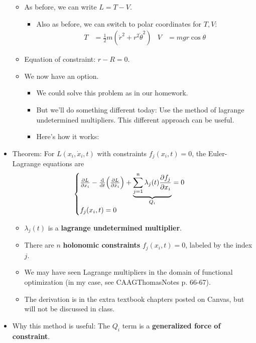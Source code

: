 \documentclass[../notes.tex]{subfiles}
\begin{document}
\begin{itemize}
\begin{itemize}
        \item As before, we can write $L=T-V$.
        \begin{itemize}
            \item Also as before, we can switch to polar coordinates for $T,V$:
            \begin{align*}
                T &= \frac{1}{2}m(\dot{r}^2+r^2\dot{\theta}^2)&
                V &= mgr\cos\theta
            \end{align*}
        \end{itemize}
        \item Equation of constraint: $r-R=0$.
        \item We now have an option.
        \begin{itemize}
            \item We could solve this problem as in our homework.
            \item But we'll do something different today: Use the method of lagrange undetermined multipliers. This different approach can be useful.
            \item Here's how it works:
        \end{itemize}
    \end{itemize}
    \item Theorem: For $L(x_i,\dot{x}_i,t)$ with constraints $f_j(x_i,t)=0$, the Euler-Lagrange equations are
    \begin{equation*}
        \begin{cases}
            \pdv{L}{x_i}-\dv{t}(\pdv{L}{\dot{x}_i})+\underbrace{\sum_{j=1}^n\lambda_j(t)\pdv{f_j}{x_i}}_{Q_i} = 0\\
            f_j(x_i,t) = 0
        \end{cases}
    \end{equation*}
    \begin{itemize}
        \item $\lambda_j(t)$ is a \textbf{lagrange undetermined multiplier}.
        \item There are $n$ \textbf{holonomic constraints} $f_j(x_i,t)=0$, labeled by the index $j$.
        \item We may have seen Lagrange multipliers in the domain of functional optimization (in my case, see CAAGThomasNotes p. 66-67).
        \item The derivation is in the extra textbook chapters posted on Canvas, but will not be discussed in class.
    \end{itemize}
    \item Why this method is useful: The $Q_i$ term is a \textbf{generalized force of constraint}.

\end{itemize}
\end{document}
